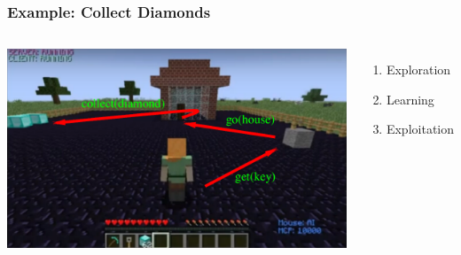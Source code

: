 \documentclass[aspectratio=169]{beamer}
\begin{document}
\begin{frame}
  \frametitle{Example: Collect Diamonds}


  \begin{columns}
    \column{4.4in}
    \includegraphics[scale=0.33]{pictures/minecraft-arrows.png} %
    \column{1.7in}
    \begin{enumerate}
    \item Exploration
    \item Learning
    \item Exploitation
    \end{enumerate}
  \end{columns}
\end{frame}
\end{document}
